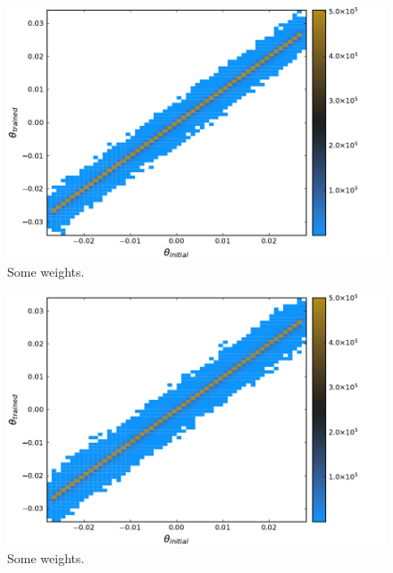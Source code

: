 \begin{figure}
    \includegraphics[width=\textwidth]{figuras/capitulo-3/weights_phi=0.25.pdf}
    \caption[Comparison between weights, $\phi=0.25$.]{Some weights.}
    \label{fig:pesos25}
\end{figure}

\begin{figure}
    \includegraphics[width=\textwidth]{figuras/capitulo-3/weights_phi=0.35.pdf}
    \caption[Comparison between weights, $\phi=0.35$.]{Some weights.}
    \label{fig:pesos35}
\end{figure}


